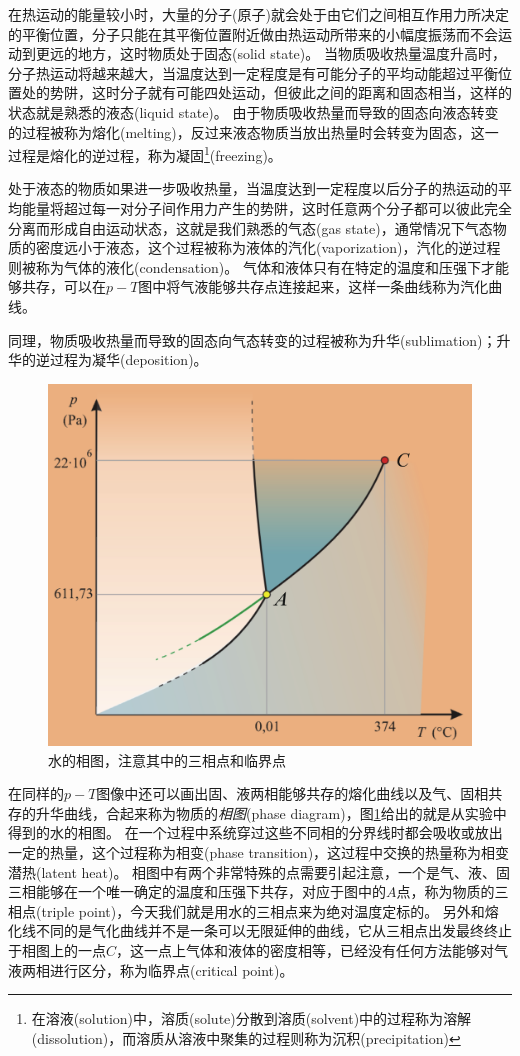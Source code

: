 在热运动的能量较小时，大量的分子(原子)就会处于由它们之间相互作用力所决定的平衡位置，分子只能在其平衡位置附近做由热运动所带来的小幅度振荡而不会运动到更远的地方，这时物质处于{\heiti 固态}(solid state)。
当物质吸收热量温度升高时，分子热运动将越来越大，当温度达到一定程度是有可能分子的平均动能超过平衡位置处的势阱，这时分子就有可能四处运动，但彼此之间的距离和固态相当，这样的状态就是熟悉的{\heiti 液态}(liquid state)。
由于物质吸收热量而导致的固态向液态转变的过程被称为{\heiti 熔化}(melting)，反过来液态物质当放出热量时会转变为固态，这一过程是熔化的逆过程，称为{\heiti 凝固}\footnote{在{\heiti 溶液}(solution)中，{\heiti 溶质}(solute)分散到{\heiti 溶质}(solvent)中的过程称为{\heiti 溶解}(dissolution)，而溶质从溶液中聚集的过程则称为{\heiti 沉积}(precipitation)}(freezing)。

处于液态的物质如果进一步吸收热量，当温度达到一定程度以后分子的热运动的平均能量将超过每一对分子间作用力产生的势阱，这时任意两个分子都可以彼此完全分离而形成自由运动状态，这就是我们熟悉的{\heiti 气态}(gas state)，通常情况下气态物质的密度远小于液态，这个过程被称为液体的{\heiti 汽化}(vaporization)，汽化的逆过程则被称为气体的{\heiti 液化}(condensation)。
气体和液体只有在特定的温度和压强下才能够共存，可以在$p-T$图中将气液能够共存点连接起来，这样一条曲线称为{\heiti 汽化曲线}。

同理，物质吸收热量而导致的固态向气态转变的过程被称为{\heiti 升华}(sublimation)；升华的逆过程为{\heiti 凝华}(deposition)。

\begin{figure}[h]
	\centering
	\includegraphics[width=0.5\linewidth]{images/thermal-21}
	\caption{水的相图，注意其中的三相点和临界点}
	\label{fig:thermal-21}
\end{figure}


在同样的$p-T$图像中还可以画出固、液两相能够共存的熔化曲线以及气、固相共存的升华曲线，合起来称为物质的\emph{相图}(phase diagram)，图\ref{fig:thermal-21}给出的就是从实验中得到的水的相图。
在一个过程中系统穿过这些不同相的分界线时都会吸收或放出一定的热量，这个过程称为{\heiti 相变}(phase transition)，这过程中交换的热量称为相变{\heiti 潜热}(latent heat)。
相图中有两个非常特殊的点需要引起注意，一个是气、液、固三相能够在一个唯一确定的温度和压强下共存，对应于图中的$A$点，称为物质的{\heiti 三相点}(triple point)，今天我们就是用水的三相点来为绝对温度定标的。
另外和熔化线不同的是气化曲线并不是一条可以无限延伸的曲线，它从三相点出发最终终止于相图上的一点$C$，这一点上气体和液体的密度相等，已经没有任何方法能够对气液两相进行区分，称为{\heiti 临界点}(critical point)。




